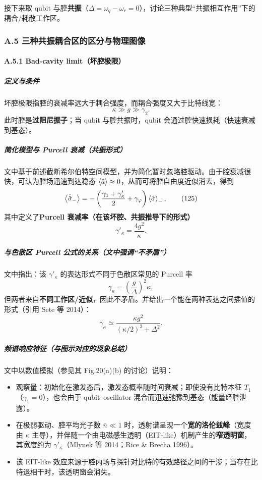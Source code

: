 \documentclass[12pt,a4paper,oneside]{ctexbook}
\let\oldparagraph\paragraph
\renewcommand{\paragraph}[1]{\oldparagraph{#1}\mbox{}}
\let\oldsubparagraph\subparagraph
\renewcommand{\subparagraph}[1]{\oldsubparagraph{#1}\mbox{}}
\begin{document}
接下来取 qubit 与腔\textbf{共振}（$\Delta=\omega_q-\omega_r=0$），讨论三种典型“共振相互作用”下的耦合/耗散工作区。

\subsubsection{A.5 三种共振耦合区的区分与物理图像}

\paragraph{A.5.1 Bad-cavity limit（坏腔极限）}
\subparagraph{定义与条件}
坏腔极限指腔的衰减率远大于耦合强度，而耦合强度又大于比特线宽：
\[
\kappa \gg g \gg \gamma_2.
\]
此时腔是\textbf{过阻尼振子}；当 qubit 与腔共振时，qubit 会通过腔快速损耗（快速衰减到基态）。

\subparagraph{简化模型与 Purcell 衰减（共振形式）}
文中基于前述截断希尔伯特空间模型，并为简化暂时忽略腔驱动。由于腔衰减很快，可认为腔场迅速到达稳态 $\expval{\hat a}\approx 0$，从而可将腔自由度近似消去，得到
\begin{equation}
\expval{\dot{\hat\sigma}_-}
=
-\left(\frac{\gamma_1+\gamma'_\kappa}{2}+\gamma_\varphi\right)\expval{\hat\sigma}_-,
\tag{125}
\end{equation}
其中定义了\textbf{Purcell 衰减率（在该坏腔、共振推导下的形式）}
\[
\gamma'_\kappa=\frac{4g^2}{\kappa}.
\]

\subparagraph{与色散区 Purcell 公式的关系（文中强调“不矛盾”）}
文中指出：该 $\gamma'_\kappa$ 的表达形式不同于色散区常见的 Purcell 率
\[
\gamma_\kappa=\left(\frac{g}{\Delta}\right)^2\kappa,
\]
但两者来自\textbf{不同工作区/近似}，因此不矛盾。并给出一个能在两种表达之间插值的形式（引用 Sete 等 2014）：
\[
\gamma_\kappa \simeq \frac{\kappa g^2}{(\kappa/2)^2+\Delta^2}.
\]

\subparagraph{频谱响应特征（与图示对应的现象总结）}
文中以数值模拟（参见其 Fig.20(a)(b) 的讨论）说明：
\begin{itemize}
\item 观察量：初始化在激发态后，激发态概率随时间衰减；即使没有比特本征 $T_1$（$\gamma_1=0$），也会由于 qubit--oscillator 混合而迅速弛豫到基态（能量经腔泄露）。
\item 在极弱驱动、腔平均光子数 $\bar n\ll 1$ 时，透射谱呈现一个\textbf{宽的洛伦兹峰}（宽度由 $\kappa$ 主导），并伴随一个由电磁感生透明（EIT-like）机制产生的\textbf{窄透明窗}，其宽度约为 $\gamma'_\kappa$（Mlynek 等 2014；Rice \& Brecha 1996）。
\item 该 EIT-like 效应来源于腔内场与探针对比特的有效路径之间的干涉；当存在比特退相干时，该透明窗会消失。
\end{itemize}
\end{document}
